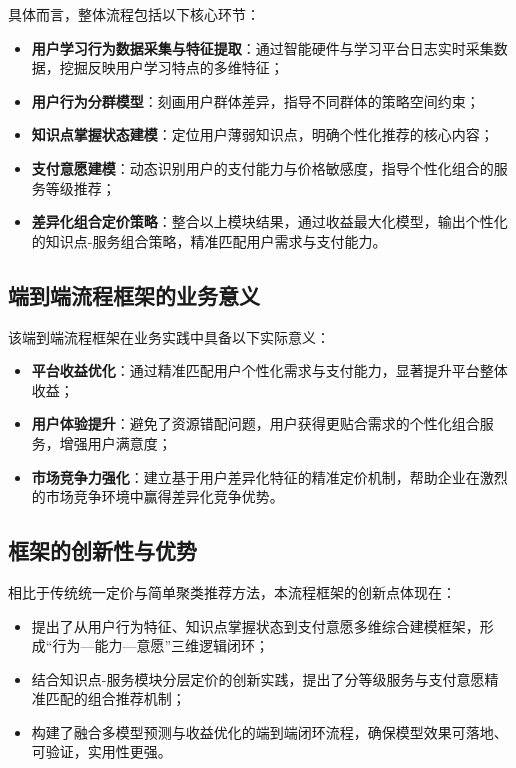 具体而言，整体流程包括以下核心环节：

\begin{itemize}
\item \textbf{用户学习行为数据采集与特征提取}：通过智能硬件与学习平台日志实时采集数据，挖掘反映用户学习特点的多维特征；
\item \textbf{用户行为分群模型}：刻画用户群体差异，指导不同群体的策略空间约束；
\item \textbf{知识点掌握状态建模}：定位用户薄弱知识点，明确个性化推荐的核心内容；
\item \textbf{支付意愿建模}：动态识别用户的支付能力与价格敏感度，指导个性化组合的服务等级推荐；
\item \textbf{差异化组合定价策略}：整合以上模块结果，通过收益最大化模型，输出个性化的知识点-服务组合策略，精准匹配用户需求与支付能力。
\end{itemize}

\subsection{端到端流程框架的业务意义}

该端到端流程框架在业务实践中具备以下实际意义：

\begin{itemize}
\item \textbf{平台收益优化}：通过精准匹配用户个性化需求与支付能力，显著提升平台整体收益；
\item \textbf{用户体验提升}：避免了资源错配问题，用户获得更贴合需求的个性化组合服务，增强用户满意度；
\item \textbf{市场竞争力强化}：建立基于用户差异化特征的精准定价机制，帮助企业在激烈的市场竞争环境中赢得差异化竞争优势。
\end{itemize}

\subsection{框架的创新性与优势}

相比于传统统一定价与简单聚类推荐方法，本流程框架的创新点体现在：

\begin{itemize}
\item 提出了从用户行为特征、知识点掌握状态到支付意愿多维综合建模框架，形成“行为—能力—意愿”三维逻辑闭环；
\item 结合知识点-服务模块分层定价的创新实践，提出了分等级服务与支付意愿精准匹配的组合推荐机制；
\item 构建了融合多模型预测与收益优化的端到端闭环流程，确保模型效果可落地、可验证，实用性更强。
\end{itemize}

